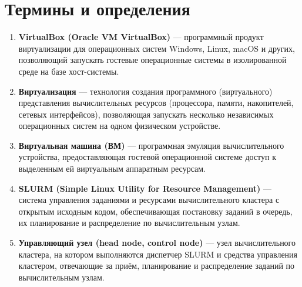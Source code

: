\newpage
\section*{Термины и определения}

\begin{enumerate}
\item \textbf{VirtualBox (Oracle VM VirtualBox)} --- программный продукт
виртуализации для операционных систем Windows, Linux, macOS и других, позволяющий запускать гостевые операционные
системы в изолированной среде на базе хост-системы.

\item \textbf{Виртуализация} --- технология создания программного
(виртуального) представления вычислительных ресурсов (процессора, памяти,
накопителей, сетевых интерфейсов), позволяющая запускать несколько
независимых операционных систем на одном физическом устройстве.

\item \textbf{Виртуальная машина (ВМ)} --- программная эмуляция
вычислительного устройства, предоставляющая гостевой операционной системе
доступ к выделенным ей виртуальным аппаратным ресурсам.



\item \textbf{SLURM (Simple Linux Utility for Resource Management)} ---
система управления заданиями и ресурсами вычислительного кластера с
открытым исходным кодом, обеспечивающая постановку заданий в очередь, их
планирование и распределение по вычислительным узлам.

\item \textbf{Управляющий узел (head node, control node)} --- узел
вычислительного кластера, на котором выполняются диспетчер SLURM и
средства управления кластером, отвечающие за приём, планирование и
распределение заданий по вычислительным узлам.


\end{enumerate}

